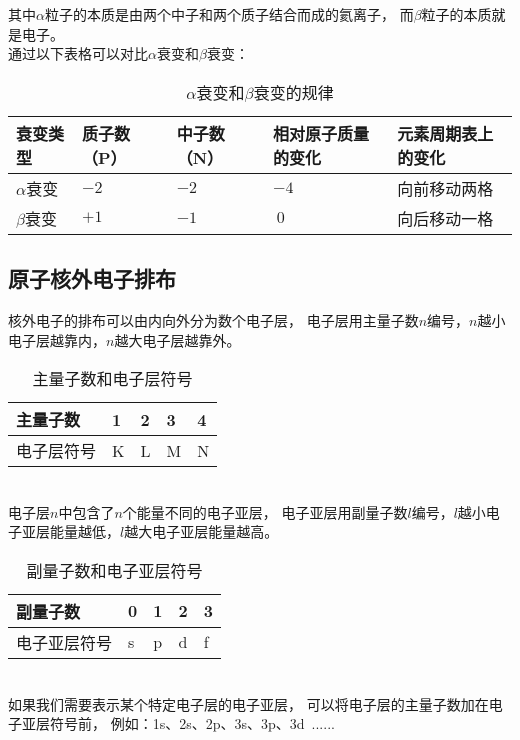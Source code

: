 \documentclass[UTF8]{ctexart}
\begin{document}
    其中$\alpha$粒子的本质是由两个中子和两个质子结合而成的氦离子，
    而$\beta$粒子的本质就是电子。\\[3mm]
    通过以下表格可以对比$\alpha$衰变和$\beta$衰变：\vspace{3pt}
    \begin{table}[h]
        \begin{center}
            \begin{tabular}{l|l|l|l|l}
                \hline
                衰变类型\qquad&质子数（P）\qquad&中子数（N）\qquad&相对原子质量的变化\qquad&元素周期表上的变化\\ \hline
                $\alpha$衰变&$-2$&$-2$&$-4$&向前移动两格\\ \hline
                $\beta$衰变&$+1$&$-1$&$~0$&向后移动一格\\ \hline
            \end{tabular}
            \caption{$\alpha$衰变和$\beta$衰变的规律}
        \end{center}
    \end{table}\vspace{-20pt}

\subsection{原子核外电子排布}
    核外电子的排布可以由内向外分为数个电子层，
    电子层用主量子数$n$编号，$n$越小电子层越靠内，$n$越大电子层越靠外。\\
    \begin{table}[h]
        \begin{center}
            \begin{tabular}{l|l|l|l|l}
                \hline
                主量子数\qquad\qquad&1\qquad\qquad&2\qquad\qquad&3\qquad\qquad&4\qquad\qquad\\ \hline
                电子层符号&K&L&M&N\\ \hline
            \end{tabular}
            \caption{主量子数和电子层符号}
        \end{center}
    \end{table}\\
    电子层$n$中包含了$n$个能量不同的电子亚层，
    电子亚层用副量子数$l$编号，$l$越小电子亚层能量越低，$l$越大电子亚层能量越高。\\
    \begin{table}[h]
        \begin{center}
            \begin{tabular}{l|l|l|l|l}
                \hline
                副量子数\qquad\qquad&0\qquad\qquad&1\qquad\qquad&2\qquad\qquad&3\qquad\qquad\\ \hline
                电子亚层符号&s&p&d&f\\ \hline
            \end{tabular}
            \caption{副量子数和电子亚层符号}
        \end{center}        
    \end{table}\\
    如果我们需要表示某个特定电子层的电子亚层，
    可以将电子层的主量子数加在电子亚层符号前，
    例如：1s、2s、2p、3s、3p、3d~......
    
\end{document}
